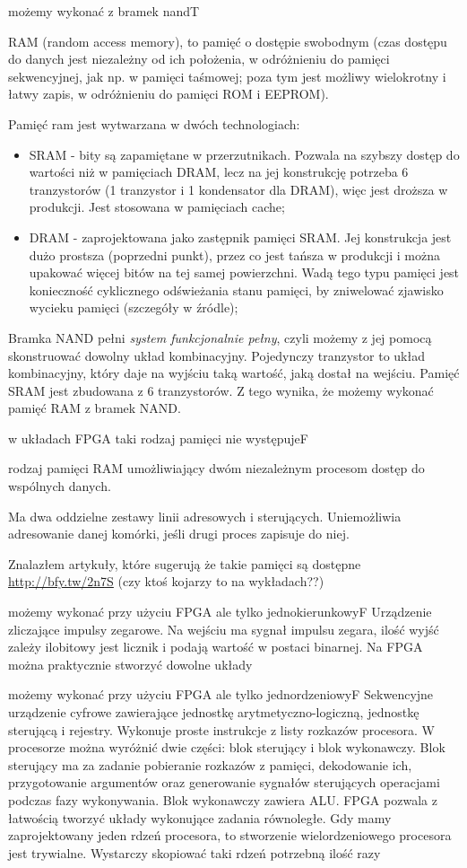 {możemy wykonać z bramek nand}{T}
{
RAM (random access memory), to pamięć o dostępie swobodnym (czas dostępu do danych jest niezależny od ich położenia, w odróżnieniu do pamięci sekwencyjnej, jak np. w pamięci taśmowej; poza tym jest możliwy wielokrotny i łatwy zapis, w odróżnieniu do pamięci ROM i EEPROM).

Pamięć ram jest wytwarzana w dwóch technologiach:
\begin{itemize}
\item SRAM - \cite{sram} bity są zapamiętane w przerzutnikach. Pozwala na szybszy dostęp do wartości niż w pamięciach DRAM, lecz na jej konstrukcję potrzeba 6 tranzystorów (1 tranzystor i 1 kondensator dla DRAM), więc jest droższa w produkcji. Jest stosowana w pamięciach cache;
\item DRAM - \cite{dram} zaprojektowana jako zastępnik pamięci SRAM. Jej konstrukcja jest dużo prostsza (poprzedni punkt), przez co jest tańsza w produkcji i można upakować więcej bitów na tej samej powierzchni. Wadą tego typu pamięci jest konieczność cyklicznego odświeżania stanu pamięci, by zniwelować zjawisko wycieku pamięci (szczegóły w źródle);
\end{itemize}
}
{
Bramka NAND pełni \emph{system funkcjonalnie pełny}, czyli możemy z jej pomocą skonstruować dowolny układ kombinacyjny. Pojedynczy tranzystor to układ kombinacyjny, który daje na wyjściu taką wartość, jaką dostał na wejściu.
Pamięć SRAM jest zbudowana z 6 tranzystorów.
Z tego wynika, że możemy wykonać pamięć RAM z bramek NAND.
}
\label{odp:92}

{w układach FPGA taki rodzaj pamięci nie występuje}{F}
{
\cite{dwuport} rodzaj pamięci RAM umożliwiający dwóm niezależnym procesom dostęp do wspólnych danych.

Ma dwa oddzielne zestawy linii adresowych i sterujących. Uniemożliwia adresowanie danej komórki, jeśli drugi proces zapisuje do niej.
}
{Znalazłem artykuły, które sugerują że takie pamięci są dostępne \url{http://bfy.tw/2n7S} (czy ktoś kojarzy to na wykładach??)}

{możemy wykonać przy użyciu FPGA ale tylko jednokierunkowy}{F}
{
\cite{licz} Urządzenie zliczające impulsy zegarowe. Na wejściu ma sygnał impulsu zegara, ilość wyjść zależy ilobitowy jest licznik i podają wartość w postaci binarnej.
}
{Na FPGA można praktycznie stworzyć dowolne układy}

{możemy wykonać przy użyciu FPGA ale tylko jednordzeniowy}{F}
{
Sekwencyjne urządzenie cyfrowe zawierające jednostkę arytmetyczno-logiczną, jednostkę sterującą i rejestry. Wykonuje proste instrukcje z listy rozkazów procesora. W procesorze można wyróżnić dwie części: blok sterujący i blok wykonawczy. Blok sterujący ma za zadanie pobieranie rozkazów z pamięci, dekodowanie ich, przygotowanie argumentów oraz generowanie sygnałów sterujących operacjami podczas fazy wykonywania. Blok wykonawczy zawiera ALU.
}
{FPGA pozwala z łatwością tworzyć układy wykonujące zadania równoległe. Gdy mamy zaprojektowany jeden rdzeń procesora, to stworzenie wielordzeniowego procesora jest trywialne. Wystarczy skopiować taki rdzeń potrzebną ilość razy}

